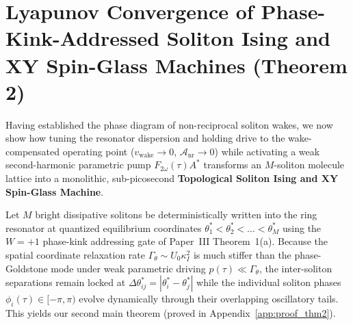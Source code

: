 \documentclass[11pt,letterpaper]{article}
\begin{document}
\section{Lyapunov Convergence of Phase-Kink-Addressed Soliton Ising and XY Spin-Glass Machines (Theorem 2)}
\label{sec:theorem2}

Having established the phase diagram of non-reciprocal soliton wakes, we now show how tuning the resonator dispersion and holding drive to the wake-compensated operating point ($v_{\mathrm{wake}} \to 0$, $\mathcal{A}_{\mathrm{nr}} \to 0$) while activating a weak second-harmonic parametric pump $F_{2\omega}(\tau)A^*$ transforms an $M$-soliton molecule lattice into a monolithic, sub-picosecond \textbf{Topological Soliton Ising and XY Spin-Glass Machine}.

Let $M$ bright dissipative solitons be deterministically written into the ring resonator at quantized equilibrium coordinates $\theta_1^* < \theta_2^* < \dots < \theta_M^*$ using the $W = +1$ phase-kink addressing gate of Paper~III Theorem~1(a). Because the spatial coordinate relaxation rate $\Gamma_\theta \sim U_0 \kappa_I^2$ is much stiffer than the phase-Goldstone mode under weak parametric driving $p(\tau) \ll \Gamma_\theta$, the inter-soliton separations remain locked at $\Delta\theta_{ij}^* = |\theta_i^* - \theta_j^*|$ while the individual soliton phases $\phi_i(\tau) \in [-\pi, \pi)$ evolve dynamically through their overlapping oscillatory tails. This yields our second main theorem (proved in Appendix~\ref{app:proof_thm2}).
\end{document}

